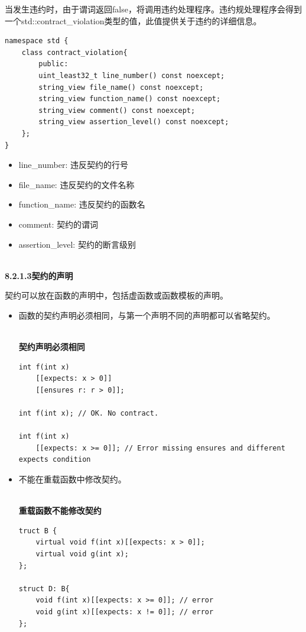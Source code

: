 当发生违约时，由于谓词返回false，将调用违约处理程序。违约规处理程序会得到一个std::contract\_violation类型的值，此值提供关于违约的详细信息。

\begin{lstlisting}[style=styleCXX]
namespace std {
	class contract_violation{
		public:
		uint_least32_t line_number() const noexcept;
		string_view file_name() const noexcept;
		string_view function_name() const noexcept;
		string_view comment() const noexcept;
		string_view assertion_level() const noexcept;
	};
}
\end{lstlisting}

\begin{itemize}
\item 
line\_number: 违反契约的行号

\item 
file\_name: 违反契约的文件名称

\item 
function\_name: 违反契约的函数名

\item 
comment: 契约的谓词

\item 
assertion\_level: 契约的断言级别
\end{itemize}

\hspace*{\fill} \\ %
\noindent
\textbf{8.2.1.3\hspace{0.2cm}契约的声明}

契约可以放在函数的声明中，包括虚函数或函数模板的声明。

\begin{itemize}
\item 
函数的契约声明必须相同，与第一个声明不同的声明都可以省略契约。

\hspace*{\fill} \\ %
\noindent
\textbf{契约声明必须相同}
\begin{lstlisting}[style=styleCXX]
int f(int x)
	[[expects: x > 0]]
	[[ensures r: r > 0]];

int f(int x); // OK. No contract.

int f(int x)
	[[expects: x >= 0]]; // Error missing ensures and different expects condition
\end{lstlisting}

\item 
不能在重载函数中修改契约。

\hspace*{\fill} \\ %
\noindent
\textbf{重载函数不能修改契约}
\begin{lstlisting}[style=styleCXX]
truct B {
	virtual void f(int x)[[expects: x > 0]];
	virtual void g(int x);
};

struct D: B{
	void f(int x)[[expects: x >= 0]]; // error
	void g(int x)[[expects: x != 0]]; // error
};
\end{lstlisting}
\end{itemize}

